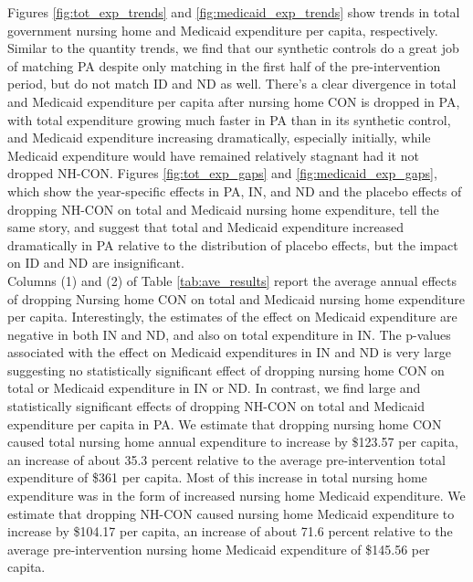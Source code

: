 \documentclass[../Main.tex]{subfiles}
\begin{document}
\indent Figures \ref{fig:tot_exp_trends} and \ref{fig:medicaid_exp_trends} show trends in total government nursing home and Medicaid expenditure per capita, respectively. Similar to the quantity trends, we find that our synthetic controls do a great job of matching PA despite only matching in the first half of the pre-intervention period, but do not match ID and ND as well. There's a clear divergence in total and Medicaid expenditure per capita after nursing home CON is dropped in PA, with total expenditure growing much faster in PA than in its synthetic control, and Medicaid expenditure increasing dramatically, especially initially, while Medicaid expenditure would have remained relatively stagnant had it not dropped NH-CON. Figures \ref{fig:tot_exp_gaps} and \ref{fig:medicaid_exp_gaps}, which show the year-specific effects in PA, IN, and ND and the placebo effects of dropping NH-CON on total and Medicaid nursing home expenditure, tell  the same story, and suggest that total and Medicaid expenditure increased dramatically in PA relative to the distribution of placebo effects, but the impact on ID and ND are insignificant.\\
\indent Columns (1) and (2) of Table \ref{tab:ave_results} report the average annual effects of dropping Nursing home CON on total and Medicaid nursing home expenditure per capita. Interestingly, the estimates of the effect on Medicaid expenditure are negative in both IN and ND, and also on total expenditure in IN. The p-values associated with the effect on Medicaid expenditures in IN and ND is very large suggesting no statistically significant effect of dropping nursing home CON on total or Medicaid expenditure in IN or ND. In contrast, we find large and statistically significant effects of dropping NH-CON on total and Medicaid expenditure per capita in PA. We estimate that dropping nursing home CON caused total nursing home annual expenditure to increase by \$123.57 per capita, an increase of about 35.3 percent relative to the average pre-intervention total expenditure of \$361 per capita. Most of this increase in total nursing home expenditure was in the form of increased nursing home Medicaid expenditure. We estimate that dropping NH-CON caused nursing home Medicaid expenditure to increase by \$104.17 per capita, an increase of about 71.6 percent relative to the average pre-intervention nursing home Medicaid expenditure of \$145.56 per capita.
\end{document}
